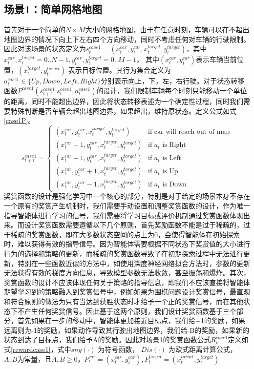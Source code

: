 \documentclass{standalone}
\begin{document}
\subsection{场景1：简单网格地图}
首先对于一个简单的$N \times M$大小的网格地图，由于在任意时刻，车辆可以在不超出地图边界的情况下向上下左右四个方向移动，同时不考虑任何对车辆的行驶限制。因此对该场景的状态定义为$s_t^{case1} = (x_t^{car}, y_t^{car}, x^{target}_t, y^{target}_t)$，其中 $x_t^{car}, x^{target}_t=0..N-1, y_t^{car}, y^{target}_t=0..M-1$， 其中$(x_t^{car}, y_t^{car})$表示车辆当前位置，$(x^{target}_t, y^{target}_t)$ 表示目标位置。其行为集合定义为$a_t^{case1} \in \{Up, Down, Left, Right\}$分别表示向上，下，左，右行驶。对于状态转移函数$P^{case1}{(s_{t+1}^{case1}|s_t^{case1}, a_t^{case1})}$的设计，我们限制车辆每个时刻只能移动一个单位的距离，同时不能超出边界，因此将状态转移表述为一个确定性过程，同时我们需要特殊判断是否车辆会超出地图边界，如果超出，维持原状态。定义公式如式\ref{case1P}。
    \begin{equation}
    \label{case1P}
    s_{t+1}^{case1} = \begin{cases}
    (x_t^{car}, y_t^{car}, x^{target}_t, y^{target}_t) &\mbox{if car will reach out of map}\\
    (x_t^{car} + 1, y_t^{car}, x^{target}_t, y^{target}_t) &\mbox{if $a_t$ is Right}\\
    (x_t^{car} - 1, y_t^{car}, x^{target}_t, y^{target}_t) &\mbox{if $a_t$ is Left}\\
    (x_t^{car}, y_t^{car} + 1, x^{target}_t, y^{target}_t) &\mbox{if $a_t$ is Up}\\
    (x_t^{car}, y_t^{car} - 1, x^{target}_t, y^{target}_t) &\mbox{if $a_t$ is Down}
    \end{cases}
\end{equation}
奖赏函数的设计是强化学习中一个核心的部分，特别是对于给定的场景本身不存在一个原有的奖赏产生机制时，我们需要手动设置和调整奖赏函数的设计，作为唯一指导智能体进行学习的信号，我们需要将学习目标或评价机制通过奖赏函数体现出来。而设计奖赏函数需要遵循以下几个原则，首先奖励函数不能是过于稀疏的，过于稀疏的奖赏函数，即在大多数状态空间的点上为0，会使得智能体在初始探索时，难以获得有效的指导信号。因为智能体需要根据不同状态下奖赏值的大小进行行为的选择和策略的更新，而稀疏的奖赏函数导致了在初期探索过程中无法进行更新，特别在一些函数近似的方法中，如使用深度神经网络拟合方法时，参数的更新无法获得有效的梯度方向信息，导致模型参数无法收敛，甚至振荡和爆炸。其次，奖赏函数的设计不应该体现任何关于策略的指导信息，即我们不应该直接将智能体期望学习到的策略融入到奖赏信号中，例如如果为围棋问题设计奖赏信号，最直观和符合原则的做法为只有当达到获胜状态时才给予一个正的奖赏信号，而在其他状态下不产生任何奖赏信号。因此基于这两个原则，我们设计奖赏函数基于三个部分，首先如果在一步的移动中，智能体更加接近目标点，我们给+1的奖励，如果远离则为-1的奖励，如果动作导致其行驶出地图边界，我们给-B的奖励，如果新的状态到达了目标点，我们给予A的奖励。因此对场景1的奖赏函数公式$R_t^{case1}$定义如式\ref{rewardcase1}，式中$sng(\cdot)$ 为符号函数， $Dis(\cdot)$ 为欧式距离计算公式，$A,B$为常量，且$A, B \geq 0$，$P_{t}^{car} = (x_t^{car}, y_t^{car}), P_{t}^{target} = (x^{target}_t, y^{target}_t)$
\end{document}
